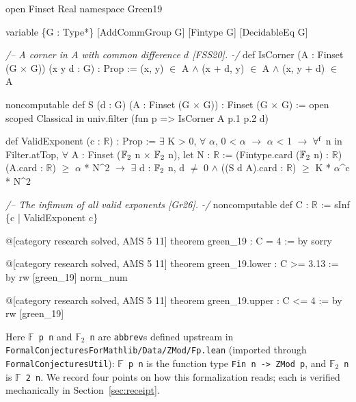 \documentclass[11pt,reqno]{amsart}
\theoremstyle{remark}
\newcommand{\F}{\mathbb{F}}
\newcommand{\R}{\mathbb{R}}
\newcommand{\LeanUS}{\textunderscore\hspace{0pt}}
\newcommand{\lean}[1]{{\let\_\LeanUS\texttt{#1}}}
\begin{document}
\begin{leancode}
open Finset Real
namespace Green19

variable \{G : Type*\} [AddCommGroup G] [Fintype G] [DecidableEq G]

\textit{/-- A corner in $A$ with common difference $d$ [FSS20]. -/}
def IsCorner (A : Finset (G \(\times\) G)) (x y d : G) : Prop :=
  (x, y) \(\in\) A \(\land\) (x + d, y) \(\in\) A \(\land\) (x, y + d) \(\in\) A

noncomputable def S (d : G) (A : Finset (G \(\times\) G)) : Finset (G \(\times\) G) :=
  open scoped Classical in
  univ.filter (fun p => IsCorner A p.1 p.2 d)

def ValidExponent (c : \(\R\)) : Prop :=
  \(\exists\) K > 0,
    \(\forall\) \(\alpha\), 0 < \(\alpha\) \(\to\) \(\alpha\) < 1 \(\to\)
      \(\forall\sp{\mathrm{f}}\) n in Filter.atTop,
        \(\forall\) A : Finset (\(\F\sb{2}\) n \(\times\) \(\F\sb{2}\) n),
          let N : \(\R\) := (Fintype.card (\(\F\sb{2}\) n) : \(\R\))
          (A.card : \(\R\)) \(\ge\) \(\alpha\) * N^2 \(\to\)
          \(\exists\) d : \(\F\sb{2}\) n, d \(\neq\) 0 \(\land\) ((S d A).card : \(\R\)) \(\ge\) K * \(\alpha\)^c * N^2

\textit{/-- The infimum of all valid exponents [Gr26]. -/}
noncomputable def C : \(\R\) := sInf \{c | ValidExponent c\}

@[category research solved, AMS 5 11]
theorem green_19 : C = 4 := by
  sorry

@[category research solved, AMS 5 11]
theorem green_19.lower : C >= 3.13 := by
  rw [green_19]
  norm_num

@[category research solved, AMS 5 11]
theorem green_19.upper : C <= 4 := by
  rw [green_19]
\end{leancode}

Here \lean{$\F$ p n} and \lean{$\F_2$ n} are \lean{abbrev}s defined upstream in \lean{FormalConjecturesForMathlib/\allowbreak{}\allowbreak Data/\allowbreak{}\allowbreak ZMod/\allowbreak{}\allowbreak Fp.\allowbreak{}lean} (imported through \lean{FormalConjecturesUtil}): \lean{$\F$ p n} is the function type \lean{Fin n -> ZMod p}, and \lean{$\F_2$ n} is \lean{$\F$ 2 n}. We record four points on how this formalization reads; each is verified mechanically in Section~\ref{sec:receipt}.
\end{document}
